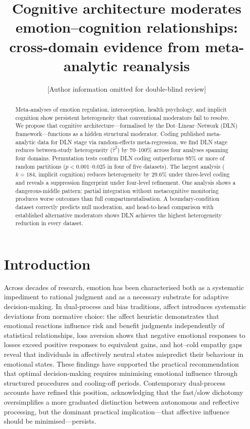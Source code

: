 \documentclass[11pt]{article}
\title{Cognitive architecture moderates emotion--cognition relationships:
cross-domain evidence from meta-analytic reanalysis}
\author{[Author information omitted for double-blind review]}
\date{}
\begin{document}
\linenumbers
\maketitle

\begin{abstract}
\noindent
Meta-analyses of emotion regulation, interoception, health psychology,
and implicit cognition show persistent heterogeneity that conventional
moderators fail to resolve. We propose that cognitive
architecture---formalised by the Dot--Linear--Network (DLN)
framework---functions as a hidden structural moderator. Coding published
meta-analytic data for DLN stage via random-effects meta-regression, we
find DLN stage reduces between-study heterogeneity ($\hat\tau^2$) by
70--100\% across four analyses spanning four domains. Permutation tests
confirm DLN coding outperforms 95\% or more of random partitions
($p < 0.001$--$0.025$ in four of five datasets). The largest analysis
($k = 184$, implicit cognition) reduces heterogeneity by 29.6\% under
three-level coding and reveals a suppression fingerprint under four-level
refinement. One analysis shows a dangerous-middle pattern: partial
integration without metacognitive monitoring produces worse outcomes than
full compartmentalisation. A boundary-condition dataset correctly predicts
null moderation, and head-to-head comparison with established alternative
moderators shows DLN achieves the highest heterogeneity reduction in
every dataset.
\end{abstract}


\section{Introduction}

Across decades of research, emotion has been characterised both as a
systematic impediment to rational judgment and as a necessary substrate
for adaptive decision-making. In dual-process and bias traditions, affect
introduces systematic deviations from normative choice: the affect
heuristic demonstrates that emotional reactions influence risk and
benefit judgments independently of statistical relationships\cite{Slovic2007},
loss aversion shows that negative emotional responses to losses exceed
positive responses to equivalent gains\cite{Kahneman1979}, and hot--cold
empathy gaps reveal that individuals in affectively neutral states
mispredict their behaviour in emotional states\cite{Loewenstein2005}.
These findings have supported the practical recommendation that optimal
decision-making requires minimising emotional influence through
structured procedures and cooling-off periods. Contemporary dual-process
accounts have refined this position, acknowledging that the fast/slow
dichotomy oversimplifies a more graduated distinction between autonomous
and reflective processing\cite{Evans2013}, but the dominant practical
implication---that affective influence should be minimised---persists.
\end{document}
